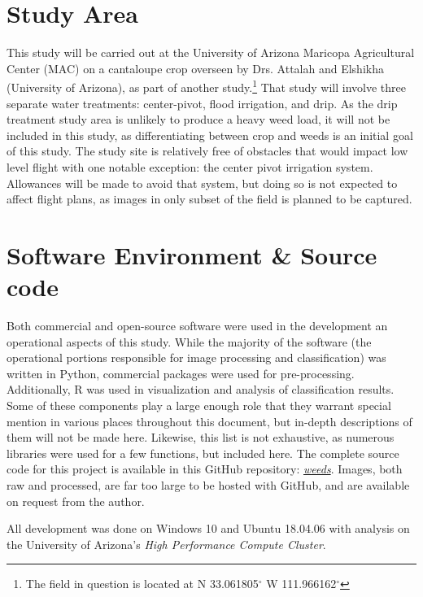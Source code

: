 \documentclass[letterpaper]{article}
\begin{document}
\section {Study Area}
This study will be carried out at the University of Arizona Maricopa Agricultural Center (MAC) on a cantaloupe crop overseen by Drs. Attalah and Elshikha (University of Arizona), as part of another study.\footnote{The field in question is located at N 33.061805$^{\circ}$ W 111.966162$^{\circ}$} That study will involve three separate water treatments: center-pivot, flood irrigation, and drip. As the drip treatment study area is unlikely to produce a heavy weed load, it will not be included in this study, as differentiating between crop and weeds is an initial goal of this study. The study site is relatively free of obstacles that would impact low level flight with one notable exception: the center pivot irrigation system. Allowances will be made to avoid that system, but doing so is not expected to affect flight plans, as images in only subset of the field is planned to be captured.
 

\section{Software Environment \& Source code}
Both commercial and open-source software were used in the development an operational aspects of this study. While the majority of the software (the operational portions responsible for image processing and classification) was written in Python, commercial packages were used for pre-processing. Additionally, R was used in visualization and analysis of classification results. Some of these components play a large enough role that they warrant special mention in various places throughout this document, but in-depth descriptions of them will not be made here. Likewise, this list is not exhaustive, as numerous libraries were used for a few functions, but included here. The complete source code for this project is available in this GitHub repository: \href{https://github.com/evan-mcginnis/weeds}{\textit {weeds}}. Images, both raw and processed, are far too large to be hosted with GitHub, and are available on request from the author.

All development was done on Windows 10 and Ubuntu 18.04.06 with analysis on the University of Arizona's \textit{High Performance Compute Cluster}.
\end{document}
